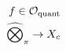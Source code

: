 \documentclass[preview]{standalone}
\begin{document}
\begin{align*}
\special{dvisvgm:raw <g id='unique000'>}f\in\mathcal{O}_{\text{quant}}\\\widehat{\bigotimes}_\pi\to X_c\special{dvisvgm:raw </g>}
\end{align*}
\end{document}
